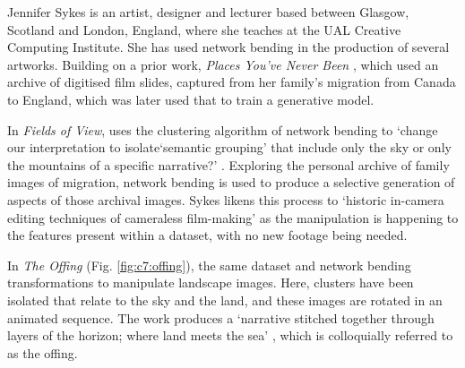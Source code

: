 Jennifer Sykes is an artist, designer and lecturer based between Glasgow, Scotland and London, England, where she teaches at the UAL Creative Computing Institute.
She has used network bending in the production of several artworks. Building on a prior work, \textit{Places You’ve Never Been} \citep{sykes2018places}, which used an archive of digitised film slides, captured from her family's migration from Canada to England, which was later used that to train a generative model. 

In \textit{Fields of View}, uses the clustering algorithm of network bending to `change our interpretation to isolate`semantic grouping' that include only the sky or only the mountains of a specific narrative?' \citep{sykes2021fields}. 
Exploring the personal archive of family images of migration, network bending is used to produce a selective generation of aspects of those archival images. 
Sykes likens this process to `historic in-camera editing techniques of cameraless film-making' \citep{sykes2021fields} as the manipulation is happening to the features present within a dataset, with no new footage being needed.

In \textit{The Offing}  (Fig. \ref{fig:c7:offing}), the same dataset and network bending transformations to manipulate landscape images. 
Here, clusters have been isolated that relate to the sky and the land, and these images are rotated in an animated sequence. 
The work produces a `narrative stitched together through layers of the horizon; where land meets the sea'  \cite{sykes2022offing}, which is colloquially referred to as the offing. 

